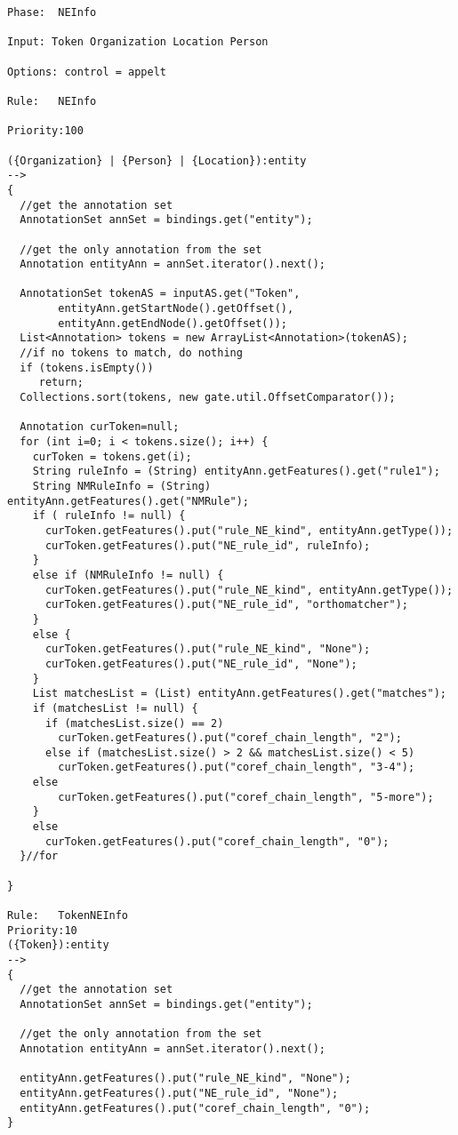 \begin{small}
\begin{verbatim}
Phase:  NEInfo

Input: Token Organization Location Person

Options: control = appelt

Rule:   NEInfo

Priority:100

({Organization} | {Person} | {Location}):entity
-->
{
  //get the annotation set
  AnnotationSet annSet = bindings.get("entity");

  //get the only annotation from the set
  Annotation entityAnn = annSet.iterator().next();

  AnnotationSet tokenAS = inputAS.get("Token",
        entityAnn.getStartNode().getOffset(),
        entityAnn.getEndNode().getOffset());
  List<Annotation> tokens = new ArrayList<Annotation>(tokenAS);
  //if no tokens to match, do nothing
  if (tokens.isEmpty())
     return;
  Collections.sort(tokens, new gate.util.OffsetComparator());

  Annotation curToken=null;
  for (int i=0; i < tokens.size(); i++) {
    curToken = tokens.get(i);
    String ruleInfo = (String) entityAnn.getFeatures().get("rule1");
    String NMRuleInfo = (String) entityAnn.getFeatures().get("NMRule");
    if ( ruleInfo != null) {
      curToken.getFeatures().put("rule_NE_kind", entityAnn.getType());
      curToken.getFeatures().put("NE_rule_id", ruleInfo);
    }
    else if (NMRuleInfo != null) {
      curToken.getFeatures().put("rule_NE_kind", entityAnn.getType());
      curToken.getFeatures().put("NE_rule_id", "orthomatcher");
    }
    else {
      curToken.getFeatures().put("rule_NE_kind", "None");
      curToken.getFeatures().put("NE_rule_id", "None");
    }
    List matchesList = (List) entityAnn.getFeatures().get("matches");
    if (matchesList != null) {
      if (matchesList.size() == 2)
        curToken.getFeatures().put("coref_chain_length", "2");
      else if (matchesList.size() > 2 && matchesList.size() < 5)
        curToken.getFeatures().put("coref_chain_length", "3-4");
    else
        curToken.getFeatures().put("coref_chain_length", "5-more");
    }
    else
      curToken.getFeatures().put("coref_chain_length", "0");
  }//for

}

Rule:   TokenNEInfo
Priority:10
({Token}):entity
-->
{
  //get the annotation set
  AnnotationSet annSet = bindings.get("entity");

  //get the only annotation from the set
  Annotation entityAnn = annSet.iterator().next();

  entityAnn.getFeatures().put("rule_NE_kind", "None");
  entityAnn.getFeatures().put("NE_rule_id", "None");
  entityAnn.getFeatures().put("coref_chain_length", "0");
}

\end{verbatim}
\end{small}

